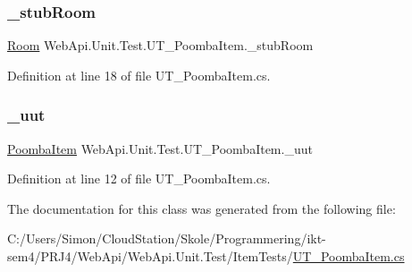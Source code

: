 \subsubsection{\texorpdfstring{\+\_\+stub\+Room}{\_stubRoom}}
{\footnotesize\ttfamily \mbox{\hyperlink{class_f_w_p_s_1_1_models_1_1_room}{Room}} Web\+Api.\+Unit.\+Test.\+U\+T\+\_\+\+Poomba\+Item.\+\_\+stub\+Room\hspace{0.3cm}{\ttfamily [private]}}



Definition at line 18 of file U\+T\+\_\+\+Poomba\+Item.\+cs.

\mbox{\label{class_web_api_1_1_unit_1_1_test_1_1_u_t___poomba_item_a670779d1c26b4a66b803a989f82eeab2}} 
\subsubsection{\texorpdfstring{\+\_\+uut}{\_uut}}
{\footnotesize\ttfamily \mbox{\hyperlink{class_f_w_p_s_1_1_models_1_1_poomba_item}{Poomba\+Item}} Web\+Api.\+Unit.\+Test.\+U\+T\+\_\+\+Poomba\+Item.\+\_\+uut\hspace{0.3cm}{\ttfamily [private]}}



Definition at line 12 of file U\+T\+\_\+\+Poomba\+Item.\+cs.



The documentation for this class was generated from the following file\+:\begin{DoxyCompactItemize}
\item 
C\+:/\+Users/\+Simon/\+Cloud\+Station/\+Skole/\+Programmering/ikt-\/sem4/\+P\+R\+J4/\+Web\+Api/\+Web\+Api.\+Unit.\+Test/\+Item\+Tests/\mbox{\hyperlink{_u_t___poomba_item_8cs}{U\+T\+\_\+\+Poomba\+Item.\+cs}}\end{DoxyCompactItemize}
